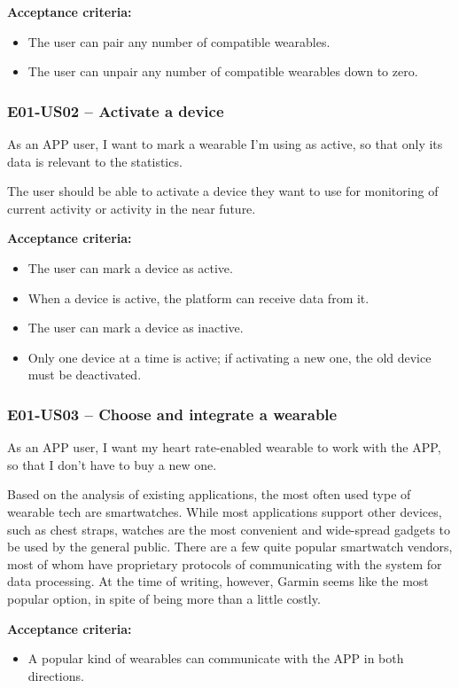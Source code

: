 \textbf{Acceptance criteria:}
\begin{itemize}
    \item The user can pair any number of compatible wearables.
    \item The user can unpair any number of compatible wearables down to zero.
\end{itemize}

\subsubsection*{E01-US02 -- Activate a device}
As an APP user, I want to mark a wearable I'm using as active, so that only its data is relevant to the statistics.

The user should be able to activate a device they want to use for monitoring of current activity or activity in the near future.

\textbf{Acceptance criteria:}
\begin{itemize}
    \item The user can mark a device as active.
    \item When a device is active, the platform can receive data from it.
    \item The user can mark a device as inactive.
    \item Only one device at a time is active; if activating a new one, the old device must be deactivated.
\end{itemize}    

\subsubsection*{E01-US03 -- Choose and integrate a wearable}
As an APP user, I want my heart rate-enabled wearable to work with the APP, so that I don't have to buy a new one.

Based on the analysis of existing applications, the most often used type of wearable tech are smartwatches.
While most applications support other devices, such as chest straps, watches are the most convenient and wide-spread gadgets to be used by the general public.
There are a few quite popular smartwatch vendors, most of whom have proprietary protocols of communicating with the system for data processing.
At the time of writing, however, Garmin seems like the most popular option, in spite of being more than a little costly.

\textbf{Acceptance criteria:}
\begin{itemize}
    \item A popular kind of wearables can communicate with the APP in both directions.
\end{itemize}


